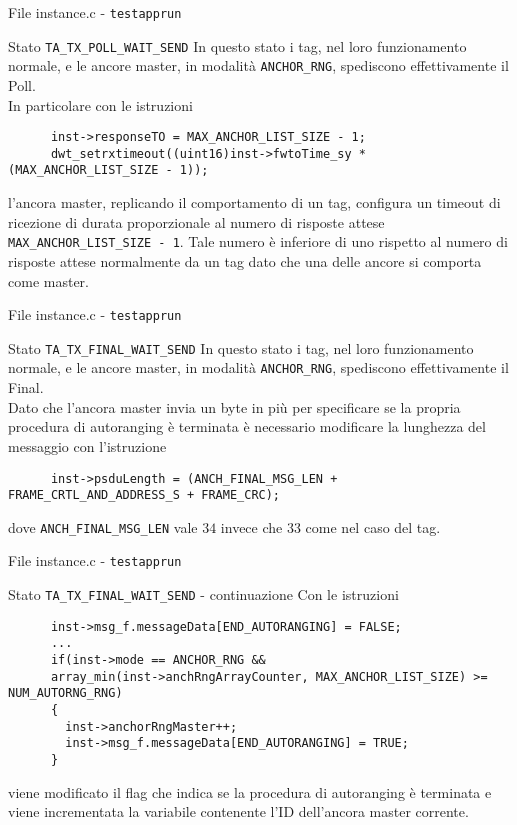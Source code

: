 \begin{frame}[fragile, shrink=10]{File instance.c - \lstinline!testapprun!}
  \begin{block}{Stato \lstinline!TA_TX_POLL_WAIT_SEND!}
    In questo stato i tag, nel loro funzionamento normale, e le ancore master, in modalità
    \lstinline!ANCHOR_RNG!, spediscono effettivamente il Poll.\\
    In particolare con le istruzioni
    \begin{lstlisting}
      inst->responseTO = MAX_ANCHOR_LIST_SIZE - 1;
      dwt_setrxtimeout((uint16)inst->fwtoTime_sy * (MAX_ANCHOR_LIST_SIZE - 1));
    \end{lstlisting}
    l'ancora master, replicando il comportamento di un tag, configura un timeout di ricezione
    di durata proporzionale al numero di risposte attese \lstinline!MAX_ANCHOR_LIST_SIZE - 1!.
    Tale numero è inferiore di uno rispetto al numero di risposte attese normalmente da un tag
    dato che una delle ancore si comporta come master.
  \end{block}
\end{frame}

\begin{frame}[fragile]{File instance.c - \lstinline!testapprun!}
  \begin{block}{Stato \lstinline!TA_TX_FINAL_WAIT_SEND!}
    In questo stato i tag, nel loro funzionamento normale, e le ancore master, in modalità
    \lstinline!ANCHOR_RNG!, spediscono effettivamente il Final.\\
    Dato che l'ancora master invia un byte in più per specificare se la \alert{propria} procedura di autoranging
    è terminata è necessario modificare la lunghezza del messaggio con l'istruzione
    \begin{lstlisting}
      inst->psduLength = (ANCH_FINAL_MSG_LEN + FRAME_CRTL_AND_ADDRESS_S + FRAME_CRC);
    \end{lstlisting}
    dove \lstinline!ANCH_FINAL_MSG_LEN! vale $34$ invece che $33$ come nel caso del tag.\\
  \end{block}
\end{frame}

\begin{frame}[fragile]{File instance.c - \lstinline!testapprun!}
  \begin{block}{Stato \lstinline!TA_TX_FINAL_WAIT_SEND! - continuazione}
    Con le istruzioni
    \begin{lstlisting}
      inst->msg_f.messageData[END_AUTORANGING] = FALSE;
      ...
      if(inst->mode == ANCHOR_RNG && 
      array_min(inst->anchRngArrayCounter, MAX_ANCHOR_LIST_SIZE) >= NUM_AUTORNG_RNG)
      {
        inst->anchorRngMaster++;
        inst->msg_f.messageData[END_AUTORANGING] = TRUE;
      }
    \end{lstlisting}
    viene modificato il flag che indica se la procedura di autoranging è terminata e viene
    incrementata la variabile contenente l'ID dell'ancora master corrente.
  \end{block}
\end{frame}

